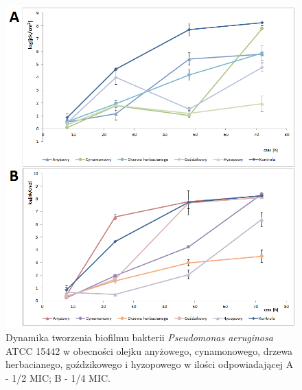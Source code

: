 \documentclass[11pt,a4paper]{report}
\begin{document}
\begin{figure}[!h]
\begin{center}
\includegraphics[scale=0.7]{img/ref-a.png}
\caption{Dynamika tworzenia biofilmu bakterii \textit{Pseudomonas aeruginosa} ATCC 15442 w obecności olejku anyżowego, cynamonowego, drzewa herbacianego, goździkowego i hyzopowego w ilości odpowiadającej A - 1/2 MIC; B - 1/4 MIC.}\label{ref-a}
\end{center} 
\end{figure}
\end{document}
